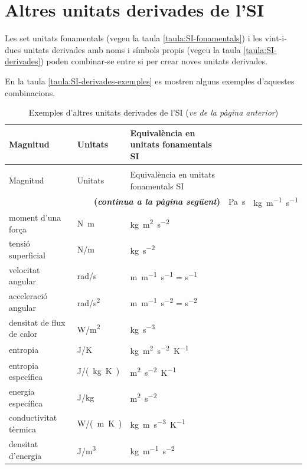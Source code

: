 \section{Altres unitats derivades de l'SI}

Les set unitats fonamentals (vegeu la taula \vref{taula:SI-fonamentals}) i les vint-i-dues unitats derivades amb noms i símbols propis (vegeu la taula \vref{taula:SI-derivades}) poden combinar-se entre si per crear noves unitats derivades.

 En la taula \vref{taula:SI-derivades-exemples} es mostren alguns exemples d'aquestes combinacions.

\begin{longtable}[h]{lll}
   \caption{\label{taula:SI-derivades-exemples} Exemples d'altres unitats derivades de
   l'SI}\\
   \toprule[1pt]
    Magnitud &  Unitats & Equivalència en unitats fonamentals SI\\
   \midrule
   \endfirsthead
   \caption[]{Exemples d'altres unitats derivades de l'SI (\emph{ve de la pàgina
   anterior})}\\
   \toprule[1pt]
    Magnitud &  Unitats & Equivalència en unitats fonamentals SI\\
   \midrule
   \endhead
   \midrule
   \multicolumn{3}{r}{\sffamily\bfseries\color{NavyBlue}(\emph{continua a la pàgina següent})}
   \endfoot
   \endlastfoot
   viscositat dinàmica &  \unit{Pa.s}& \unit{kg.m^{-1}.s^{-1}} \\
   moment d'una força & \unit{N.m} & \unit{kg.m^2.s^{-2}} \\
   tensió superficial &  \unit{N/m} &   \unit{kg.s^{-2}} \\
   velocitat angular & \unit{rad/s} & \unit{m.m^{-1}.s^{-1}} = \unit{s^{-1}} \\
   acceleració angular & \unit{rad/s^2} & \unit{m.m^{-1}.s^{-2}} = \unit{s^{-2}} \\
   densitat de flux de calor & \unit{W/m^2} & \unit{kg.s^{-3}} \\
   entropia & \unit{J/K} & \unit{kg.m^2.s^{-2}.K^{-1}} \\
   entropia específica & \unit{J/(kg.K)} &\unit{m^2.s^{-2}.K^{-1}} \\
   energia específica & \unit{J/kg} & \unit{m^2.s^{-2}} \\
   conductivitat tèrmica & \unit{W/(m.K)} & \unit{kg.m.s^{-3}.K^{-1}} \\
   densitat d'energia & \unit{J/m^3} & \unit{kg.m^{-1}.s^{-2}} \\

\end{longtable}
